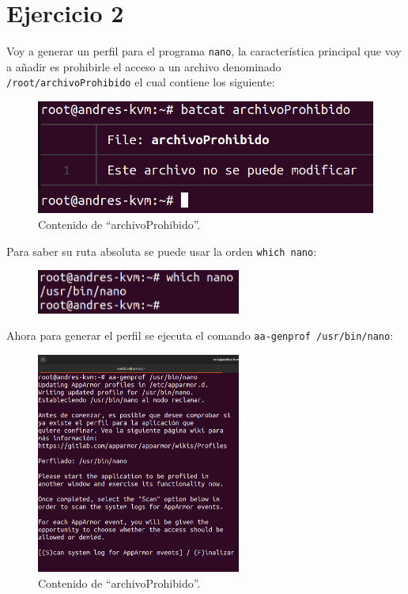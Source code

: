 \documentclass{article}
\begin{document}
\section*{Ejercicio 2}
Voy a generar un perfil para el programa \verb|nano|, la característica principal que voy a añadir es prohibirle el acceso a un archivo denominado \verb|/root/archivoProhibido| el cual contiene los siguiente:


\begin{figure}[H]
    \includegraphics[width=\textwidth]{imagenes/Captura desde 2022-10-18 16-41-05.png}
    \caption{Contenido de ``archivoProhibido''.}
\end{figure}

Para saber su ruta absoluta se puede usar la orden \verb|which nano|:

\begin{figure}[H]
    \centering
    \includegraphics[width=0.6\textwidth]{imagenes/which.png}
\end{figure}

Ahora para generar el perfil se ejecuta el comando \verb|aa-genprof /usr/bin/nano|:

\begin{figure}[H]
    \centering
    \includegraphics[width=0.6\textwidth]{imagenes/Captura desde 2022-10-18 16-41-31.png}
    \caption{Contenido de ``archivoProhibido''.}
\end{figure}
\end{document}
